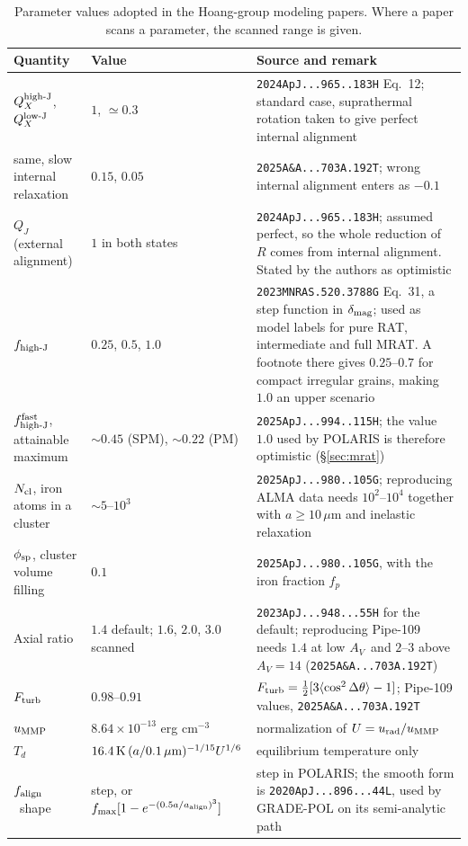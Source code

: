 \documentclass{my_memo}
\newcommand{\code}[1]{\texttt{#1}}
\newcommand{\um}{\ensuremath{\,\mu\mathrm{m}}}
\newcommand{\aalign}{\ensuremath{a_{\rm align}}}
\newcommand{\falign}{\ensuremath{f_{\rm align}}}
\newcommand{\fhighJ}{\ensuremath{f_{\rm high\text{-}J}}}
\newcommand{\Av}{\ensuremath{A_V}}
\begin{document}
\begin{table}[!ht]
\centering
\caption{Parameter values adopted in the Hoang-group modeling papers.
Where a paper scans a parameter, the scanned range is given.}
\label{tab:hoang}
\begin{tabularx}{\textwidth}{l l X}
\toprule
Quantity & Value & Source and remark \\
\midrule
$Q_X^{\rm high\text{-}J}$, $Q_X^{\rm low\text{-}J}$ &
  $1$, $\simeq 0.3$ &
  \code{2024ApJ...965..183H} Eq.~12; standard case, suprathermal
  rotation taken to give perfect internal alignment \\
same, slow internal relaxation &
  $0.15$, $0.05$ &
  \code{2025A\&A...703A.192T}; wrong internal alignment enters as
  $-0.1$ \\
$Q_J$ (external alignment) &
  $1$ in both states &
  \code{2024ApJ...965..183H}; assumed perfect, so the whole reduction of
  $R$ comes from internal alignment. Stated by the authors as optimistic \\
\fhighJ &
  $0.25$, $0.5$, $1.0$ &
  \code{2023MNRAS.520.3788G} Eq.~31, a step function in
  $\delta_{\rm mag}$; used as model labels for pure RAT, intermediate
  and full MRAT. A footnote there gives $0.25$--$0.7$ for compact
  irregular grains, making $1.0$ an upper scenario \\
$f^{\rm fast}_{\rm high\text{-}J}$, attainable maximum &
  $\sim 0.45$ (SPM), $\sim 0.22$ (PM) &
  \code{2025ApJ...994..115H}; the value $1.0$ used by POLARIS is
  therefore optimistic (\S\ref{sec:mrat}) \\
$N_{\rm cl}$, iron atoms in a cluster &
  $\sim 5$--$10^3$ &
  \code{2025ApJ...980..105G}; reproducing ALMA data needs
  $10^2$--$10^4$ together with $a \geq 10\um$ and inelastic relaxation \\
$\phi_{\rm sp}$, cluster volume filling &
  $0.1$ &
  \code{2025ApJ...980..105G}, with the iron fraction $f_p$ \\
Axial ratio &
  $1.4$ default; $1.6$, $2.0$, $3.0$ scanned &
  \code{2023ApJ...948...55H} for the default; reproducing Pipe-109
  needs $1.4$ at low \Av\ and $2$--$3$ above $\Av = 14$
  (\code{2025A\&A...703A.192T}) \\
$F_{\rm turb}$ &
  $0.98$--$0.91$ &
  $F_{\rm turb} = \frac12[3\langle\cos^2\Delta\theta\rangle - 1]$;
  Pipe-109 values, \code{2025A\&A...703A.192T} \\
$u_{\rm MMP}$ &
  $8.64\times10^{-13}$ erg cm$^{-3}$ &
  normalization of $U = u_{\rm rad}/u_{\rm MMP}$ \\
$T_d$ &
  $16.4\,{\rm K}\,(a/0.1\um)^{-1/15}U^{1/6}$ &
  equilibrium temperature only \\
\falign\ shape &
  step, or
  $f_{\max}[1 - e^{-(0.5a/\aalign)^3}]$ &
  step in POLARIS; the smooth form is \code{2020ApJ...896...44L}, used
  by GRADE-POL on its semi-analytic path \\
\bottomrule
\end{tabularx}
\end{table}
\end{document}

